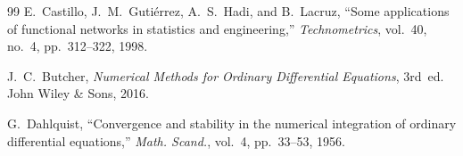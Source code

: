 \documentclass[lettersize,journal]{IEEEtran}
\begin{document}
\begin{thebibliography}{99}
E.~Castillo, J.~M.~Guti\'errez, A.~S.~Hadi, and B.~Lacruz, ``Some applications of functional networks in statistics and engineering,'' \textit{Technometrics}, vol.~40, no.~4, pp.~312--322, 1998.

J.~C.~Butcher, \textit{Numerical Methods for Ordinary Differential Equations}, 3rd~ed. John Wiley \& Sons, 2016.

G.~Dahlquist, ``Convergence and stability in the numerical integration of ordinary differential equations,'' \textit{Math. Scand.}, vol.~4, pp.~33--53, 1956.

\end{thebibliography}
\end{document}
